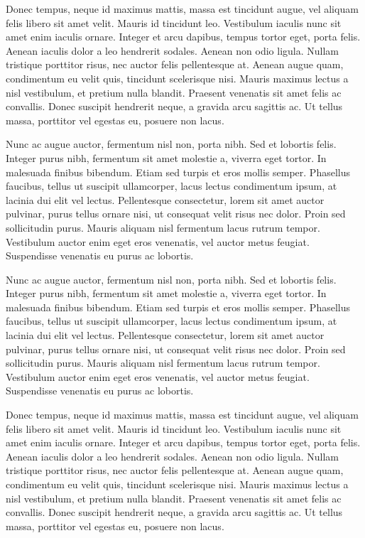 \documentclass[onecolumn,superscriptaddress,11pt,aps]{revtex4}
\begin{document}
Donec tempus, neque id maximus mattis, massa est tincidunt augue, vel aliquam felis libero sit amet velit. Mauris id tincidunt leo. Vestibulum iaculis nunc sit amet enim iaculis ornare. Integer et arcu dapibus, tempus tortor eget, porta felis. Aenean iaculis dolor a leo hendrerit sodales. Aenean non odio ligula. Nullam tristique porttitor risus, nec auctor felis pellentesque at. Aenean augue quam, condimentum eu velit quis, tincidunt scelerisque nisi. Mauris maximus lectus a nisl vestibulum, et pretium nulla blandit. Praesent venenatis sit amet felis ac convallis. Donec suscipit hendrerit neque, a gravida arcu sagittis ac. Ut tellus massa, porttitor vel egestas eu, posuere non lacus.

Nunc ac augue auctor, fermentum nisl non, porta nibh. Sed et lobortis felis. Integer purus nibh, fermentum sit amet molestie a, viverra eget tortor. In malesuada finibus bibendum. Etiam sed turpis et eros mollis semper. Phasellus faucibus, tellus ut suscipit ullamcorper, lacus lectus condimentum ipsum, at lacinia dui elit vel lectus. Pellentesque consectetur, lorem sit amet auctor pulvinar, purus tellus ornare nisi, ut consequat velit risus nec dolor. Proin sed sollicitudin purus. Mauris aliquam nisl fermentum lacus rutrum tempor. Vestibulum auctor enim eget eros venenatis, vel auctor metus feugiat. Suspendisse venenatis eu purus ac lobortis.

Nunc ac augue auctor, fermentum nisl non, porta nibh. Sed et lobortis felis. Integer purus nibh, fermentum sit amet molestie a, viverra eget tortor. In malesuada finibus bibendum. Etiam sed turpis et eros mollis semper. Phasellus faucibus, tellus ut suscipit ullamcorper, lacus lectus condimentum ipsum, at lacinia dui elit vel lectus. Pellentesque consectetur, lorem sit amet auctor pulvinar, purus tellus ornare nisi, ut consequat velit risus nec dolor. Proin sed sollicitudin purus. Mauris aliquam nisl fermentum lacus rutrum tempor. Vestibulum auctor enim eget eros venenatis, vel auctor metus feugiat. Suspendisse venenatis eu purus ac lobortis.

Donec tempus, neque id maximus mattis, massa est tincidunt augue, vel aliquam felis libero sit amet velit. Mauris id tincidunt leo. Vestibulum iaculis nunc sit amet enim iaculis ornare. Integer et arcu dapibus, tempus tortor eget, porta felis. Aenean iaculis dolor a leo hendrerit sodales. Aenean non odio ligula. Nullam tristique porttitor risus, nec auctor felis pellentesque at. Aenean augue quam, condimentum eu velit quis, tincidunt scelerisque nisi. Mauris maximus lectus a nisl vestibulum, et pretium nulla blandit. Praesent venenatis sit amet felis ac convallis. Donec suscipit hendrerit neque, a gravida arcu sagittis ac. Ut tellus massa, porttitor vel egestas eu, posuere non lacus.
\end{document}

